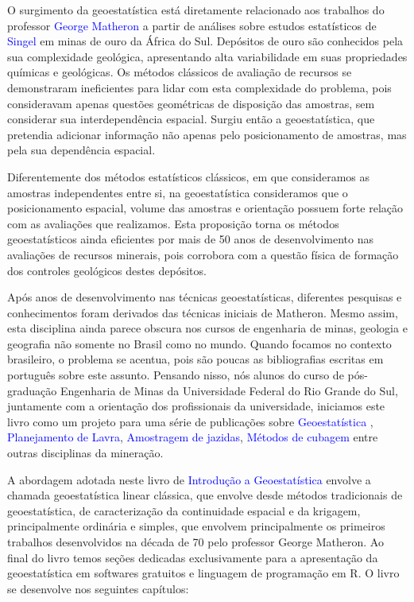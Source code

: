 \documentclass[12pt,fleqn]{book} %
\begin{document}
O surgimento da geoestatística está diretamente relacionado aos trabalhos do professor \textcolor{blue}{George Matheron} a partir de análises sobre estudos estatísticos de \textcolor{blue}{Singel} em minas de ouro da África do Sul. Depósitos de ouro são conhecidos pela sua complexidade geológica, apresentando alta variabilidade em suas propriedades químicas e geológicas. Os métodos clássicos de avaliação de recursos se demonstraram ineficientes para lidar com esta complexidade do problema, pois consideravam apenas questões geométricas de disposição das amostras, sem considerar sua interdependência espacial. Surgiu então a geoestatística, que pretendia adicionar informação não apenas pelo posicionamento de amostras, mas pela sua dependência espacial. 

Diferentemente dos métodos estatísticos clássicos, em que consideramos as amostras independentes entre si, na geoestatística consideramos que o posicionamento espacial, volume das amostras e orientação possuem forte relação com as avaliações que realizamos. Esta proposição torna os métodos geoestatísticos ainda eficientes por mais de 50 anos de desenvolvimento nas avaliações de recursos minerais, pois corrobora com a questão física de formação dos controles geológicos destes depósitos.  

Após anos de desenvolvimento nas técnicas geoestatísticas, diferentes pesquisas e conhecimentos foram derivados das técnicas iniciais de Matheron. Mesmo assim, esta disciplina ainda parece obscura nos cursos de engenharia de minas, geologia e geografia não somente no Brasil como no mundo. Quando focamos no contexto brasileiro, o problema se acentua, pois são poucas as bibliografias escritas em português sobre este assunto. Pensando nisso, nós alunos do curso de pós-graduação Engenharia de Minas da Universidade Federal do Rio Grande do Sul, juntamente com a orientação dos profissionais da universidade, iniciamos este livro como um projeto para  uma série de publicações sobre \textcolor{blue}{Geoestatística} , \textcolor{blue}{Planejamento de Lavra}, \textcolor{blue}{Amostragem de jazidas}, \textcolor{blue}{Métodos de cubagem} entre outras disciplinas da mineração. 

 A abordagem adotada neste livro de \textcolor{blue}{Introdução a Geoestatística} envolve a chamada geoestatística linear clássica, que envolve desde métodos tradicionais de geoestatística, de caracterização da continuidade espacial e da krigagem, principalmente ordinária e simples, que envolvem principalmente os primeiros trabalhos desenvolvidos na década de 70 pelo professor George Matheron. Ao final do livro temos seções dedicadas exclusivamente para a apresentação da geoestatística em softwares gratuitos e linguagem de programação em R. O livro se desenvolve nos seguintes capítulos:
\end{document}
